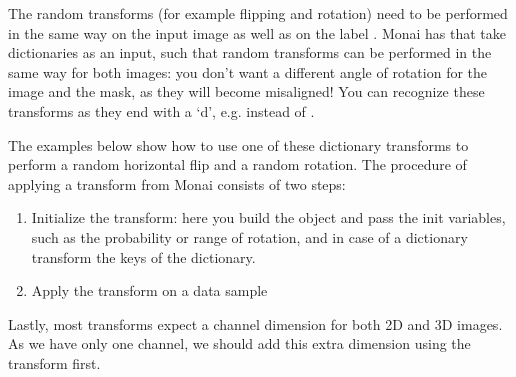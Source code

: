 \documentclass[letterpaper,10pt,english]{jupyterBook}
\begin{document}
\sphinxAtStartPar
The random transforms (for example flipping and rotation) need to be performed in the same way on the input image  as well as on the label . Monai has  that take dictionaries as an input, such that random transforms can be performed in the same way for both images: you don’t want a different angle of rotation for the image and the mask, as they will become misaligned! You can recognize these transforms as they end with a ‘d’, e.g.  instead of .



\sphinxAtStartPar
The examples below show how to use one of these dictionary transforms to perform a random horizontal flip and a random rotation. The procedure of applying a transform from Monai consists of two steps:
\begin{enumerate}
%
\item {} 
\sphinxAtStartPar
Initialize the transform: here you build the object and pass the init variables, such as the probability or range of rotation, and in case of a dictionary transform the keys of the dictionary.

\item {} 
\sphinxAtStartPar
Apply the transform on a data sample

\end{enumerate}

\sphinxAtStartPar
Lastly, most transforms expect a channel dimension for both 2D and 3D images. As we have only one channel, we should add this extra dimension using the  transform first.
\end{document}
